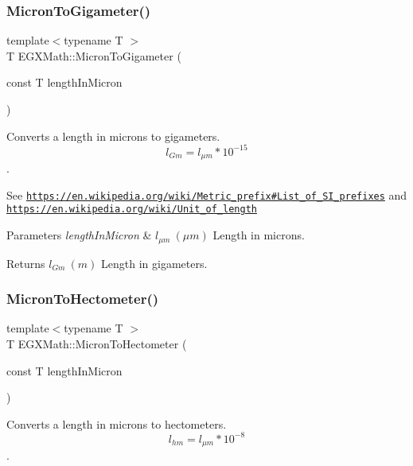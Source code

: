 \subsubsection{\texorpdfstring{Micron\+To\+Gigameter()}{MicronToGigameter()}}
{\footnotesize\ttfamily template$<$typename T $>$ \\
T E\+G\+X\+Math\+::\+Micron\+To\+Gigameter (\begin{DoxyParamCaption}\item[{const T}]{length\+In\+Micron }\end{DoxyParamCaption})}



Converts a length in microns to gigameters. \[ l_{Gm}=l_{\mu m} * 10^{-15} \]. 

See \href{https://en.wikipedia.org/wiki/Metric_prefix#List_of_SI_prefixes}{\tt https\+://en.\+wikipedia.\+org/wiki/\+Metric\+\_\+prefix\#\+List\+\_\+of\+\_\+\+S\+I\+\_\+prefixes} and \href{https://en.wikipedia.org/wiki/Unit_of_length}{\tt https\+://en.\+wikipedia.\+org/wiki/\+Unit\+\_\+of\+\_\+length} 
\begin{DoxyParams}{Parameters}
{\em length\+In\+Micron} & $ l_{\mu m}\ (\mu m)$ Length in microns. \\
\hline
\end{DoxyParams}
\begin{DoxyReturn}{Returns}
$ l_{Gm}\ (m)$ Length in gigameters. 
\end{DoxyReturn}
\mbox{\label{group___e_g_x_math-_conversions-_length_conversions-_non-_s_i-_micron-_s_i_gae1509e20f2617b926b3a0f2fef2e4d0a}} 
\subsubsection{\texorpdfstring{Micron\+To\+Hectometer()}{MicronToHectometer()}}
{\footnotesize\ttfamily template$<$typename T $>$ \\
T E\+G\+X\+Math\+::\+Micron\+To\+Hectometer (\begin{DoxyParamCaption}\item[{const T}]{length\+In\+Micron }\end{DoxyParamCaption})}



Converts a length in microns to hectometers. \[ l_{hm}=l_{\mu m} * 10^{-8} \]. 

